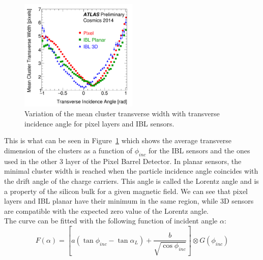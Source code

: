 \begin{figure}
\centering
\includegraphics[width=0.5\textwidth]{Images/IBL_commissioning/lorentz_angle.png}
\caption{Variation of the mean cluster transverse width with transverse incidence angle for pixel layers and IBL sensors. }
\label{pic:IBL_lorentz}

\end{figure}

This is what can be seen in Figure~\ref{pic:IBL_lorentz} which shows the average transverse dimension of the clusters as a function of $\phi_{inc}$ for the IBL sensors and the ones used in the other 3 layer of the Pixel Barrel Detector. In planar sensors, the minimal cluster width is reached when the particle incidence angle coincides with the drift angle of the charge carriers. This angle is called the Lorentz angle and is a property of the silicon bulk for a given magnetic field. We can see that pixel layers and IBL planar have their minimum in the same region, while 3D sensors are compatible with the expected zero value of the Lorentz angle.\\

The curve can be fitted with the following function of incident angle $\alpha$:
\begin{equation}
F(\alpha) = [a (\tan \phi_{inc} - \tan \alpha_L) + \frac{b}{\sqrt{\cos \phi_{inc}}}] \otimes G(\phi_{inc})
\end{equation}

